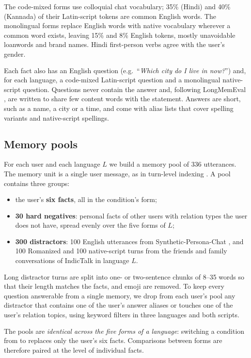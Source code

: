 The code-mixed forms use colloquial chat vocabulary; 35\% (Hindi) and 40\% (Kannada) of their Latin-script tokens are common English words. The monolingual forms replace English words with native vocabulary wherever a common word exists, leaving 15\% and 8\% English tokens, mostly unavoidable loanwords and brand names. Hindi first-person verbs agree with the user's gender.

Each fact also has an English question (e.g.\ ``\emph{Which city do I live in now?}'') and, for each language, a code-mixed Latin-script question and a monolingual native-script question. Questions never contain the answer and, following LongMemEval \citep{wu2025longmemeval}, are written to share few content words with the statement. Answers are short, such as a name, a city or a time, and come with alias lists that cover spelling variants and native-script spellings.



\subsection{Memory pools}
\label{sec:pools}
For each user and each language $L$ we build a memory pool of 336 utterances. The memory unit is a single user message, as in turn-level indexing \citep{wu2025longmemeval}. A pool contains three groups:
\begin{itemize}
\item the user's \textbf{six facts}, all in the condition's form;
\item \textbf{30 hard negatives}: personal facts of other users with relation types the user does not have, spread evenly over the five forms of $L$;
\item \textbf{300 distractors}: 100 English utterances from Synthetic-Persona-Chat \citep{jandaghi2023syntheticpersonachat}, and 100 Romanized and 100 native-script turns from the friends and family conversations of IndicTalk \citep{gawande2026indictalk} in language $L$.
\end{itemize}

Long distractor turns are split into one- or two-sentence chunks of 8--35 words so that their length matches the facts, and emoji are removed. To keep every question answerable from a single memory, we drop from each user's pool any distractor that contains one of the user's answer aliases or touches one of the user's relation topics, using keyword filters in three languages and both scripts.

The pools are \emph{identical across the five forms of a language}: switching a condition from  to  replaces only the user's six facts. Comparisons between forms are therefore paired at the level of individual facts.

